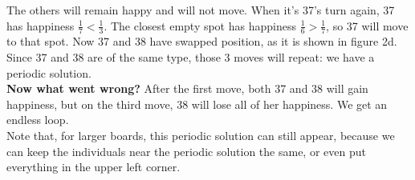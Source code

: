 The others will remain happy and will not move. When it's 37's turn again, 37 has happiness $\frac{1}{7} < \frac{1}{3}$. The closest empty spot has happiness $\frac{1}{6} > \frac{1}{7}$, so 37 will move to that spot. Now 37 and 38 have swapped position, as it is shown in figure 2d.\\
Since 37 and 38 are of the same type, those 3 moves will repeat: we have a periodic solution.\\
\textbf{Now what went wrong?} After the first move, both 37 and 38 will gain happiness, but on the third move, 38 will lose all of her happiness. We get an endless loop.\\
Note that, for larger boards, this periodic solution can still appear, because we can keep the individuals near the periodic solution the same, or even put everything in the upper left corner.

